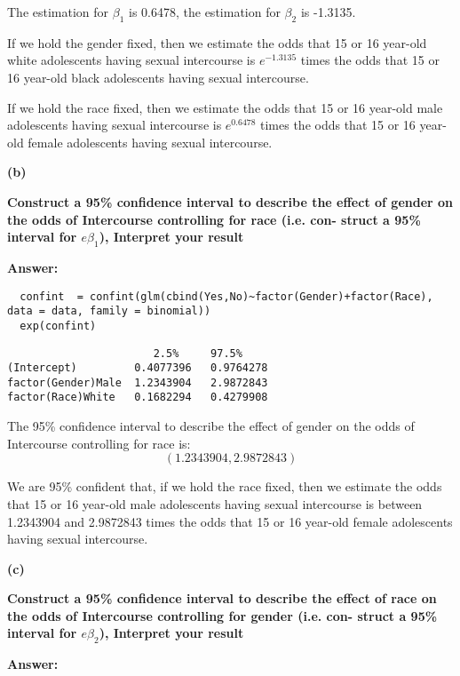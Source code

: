 \documentclass[letterpaper,11pt]{article}
\begin{document}
The estimation for $\beta_1$ is 0.6478, the estimation for $\beta_2$ is -1.3135.\par
If we hold the gender fixed, then we estimate the odds that 15 or 16 year-old white adolescents having sexual intercourse is $e^{-1.3135}$ times the odds that 15 or 16 year-old black adolescents having sexual intercourse.\par
If we hold the race fixed, then we estimate the odds that 15 or 16 year-old male adolescents having sexual intercourse is $e^{0.6478}$ times the odds that 15 or 16 year-old female adolescents having sexual intercourse.


\begin{addmargin}[-1.1em]{0em}
  \textbf{(b)}\par
\end{addmargin}
\textbf{Construct a 95\% confidence interval to describe the effect of gender on the odds of Intercourse controlling for race (i.e. con- struct a 95\% interval for $e\beta_1$), Interpret your result}\par
\bigbreak
\begin{addmargin}[-0.5em]{0em}
  \textbf{Answer: }
\end{addmargin}

\begin{lstlisting}
  confint  = confint(glm(cbind(Yes,No)~factor(Gender)+factor(Race), data = data, family = binomial))
  exp(confint)
\end{lstlisting}

\begin{lstlisting}
                       2.5%	    97.5%
(Intercept)	        0.4077396	0.9764278
factor(Gender)Male	1.2343904	2.9872843
factor(Race)White 	0.1682294	0.4279908
\end{lstlisting}

The 95\% confidence interval to describe the effect of gender on the odds of Intercourse controlling for race is:
$$(1.2343904, 2.9872843)$$

We are 95\% confident that, if we hold the race fixed, then we estimate the odds that 15 or 16 year-old male adolescents having sexual intercourse is between 1.2343904 and 2.9872843 times the odds that 15 or 16 year-old female adolescents having sexual intercourse.

\begin{addmargin}[-1.1em]{0em}
  \textbf{(c)}\par
\end{addmargin}
\textbf{Construct a 95\% confidence interval to describe the effect of race on the odds of Intercourse controlling for gender (i.e. con- struct a 95\% interval for $e\beta_2$), Interpret your result}\par
\bigbreak
\begin{addmargin}[-0.5em]{0em}
  \textbf{Answer: }
\end{addmargin}
\end{document}
